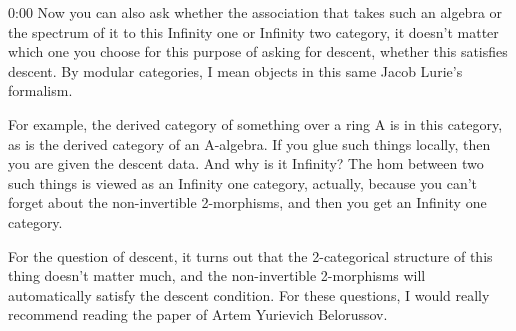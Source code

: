 \begin{unfinished}{0:00}
Now you can also ask whether the association that takes such an algebra or the spectrum of it to this Infinity one or Infinity two category, it doesn't matter which one you choose for this purpose of asking for descent, whether this satisfies descent. By modular categories, I mean objects in this same Jacob Lurie's formalism. 

For example, the derived category of something over a ring A is in this category, as is the derived category of an A-algebra. If you glue such things locally, then you are given the descent data. And why is it Infinity? The hom between two such things is viewed as an Infinity one category, actually, because you can't forget about the non-invertible 2-morphisms, and then you get an Infinity one category. 

For the question of descent, it turns out that the 2-categorical structure of this thing doesn't matter much, and the non-invertible 2-morphisms will automatically satisfy the descent condition. For these questions, I would really recommend reading the paper of Artem Yurievich Belorussov.
\end{unfinished}